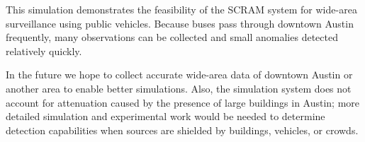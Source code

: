 This simulation demonstrates the feasibility of the SCRAM system for wide-area
surveillance using public vehicles. Because buses pass through downtown Austin
frequently, many observations can be collected and small anomalies detected
relatively quickly.

In the future we hope to collect accurate wide-area data of downtown Austin or
another area to enable better simulations. Also, the simulation system does not
account for attenuation caused by the presence of large buildings in Austin;
more detailed simulation and experimental work would be needed to determine
detection capabilities when sources are shielded by buildings, vehicles, or
crowds.
